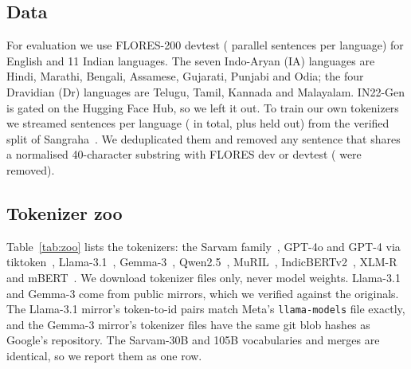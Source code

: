 \documentclass[conference]{IEEEtran}
\begin{document}
\subsection{Data}
For evaluation we use FLORES-200 devtest ( parallel sentences per language) for English and 11 Indian languages. The seven Indo-Aryan (IA) languages are Hindi, Marathi, Bengali, Assamese, Gujarati, Punjabi and Odia; the four Dravidian (Dr) languages are Telugu, Tamil, Kannada and Malayalam. IN22-Gen is gated on the Hugging Face Hub, so we left it out. To train our own tokenizers we streamed  sentences per language ( in total, plus  held out) from the verified split of Sangraha~\cite{khan-etal-2024-indicllmsuite}. We deduplicated them and removed any sentence that shares a normalised 40-character substring with FLORES dev or devtest ( were removed).

\subsection{Tokenizer zoo}
Table~\ref{tab:zoo} lists the tokenizers: the Sarvam family~\cite{sarvam2024sarvam1,sarvam2025sarvamm,sarvam2026sarvam30b}, GPT-4o and GPT-4 via tiktoken~\cite{openai2023tiktoken}, Llama-3.1~\cite{grattafiori2024llama3}, Gemma-3~\cite{gemma2025gemma3}, Qwen2.5~\cite{qwen2024qwen25}, MuRIL~\cite{khanuja2021muril}, IndicBERTv2~\cite{doddapaneni-etal-2023-towards}, XLM-R~\cite{conneau-etal-2020-unsupervised} and mBERT~\cite{devlin-etal-2019-bert}. We download tokenizer files only, never model weights. Llama-3.1 and Gemma-3 come from public mirrors, which we verified against the originals. The Llama-3.1 mirror's  token-to-id pairs match Meta's \texttt{llama-models} file exactly, and the Gemma-3 mirror's tokenizer files have the same git blob hashes as Google's repository. The Sarvam-30B and 105B vocabularies and merges are identical, so we report them as one row.

\begin{table}[t]
\centering\footnotesize
\caption{Tokenizers evaluated. ``Spans'' is how exact token byte spans are recovered.}
\label{tab:zoo}
\setlength{\tabcolsep}{3pt}
\resizebox{\columnwidth}{!}{}
\end{table}
\end{document}
